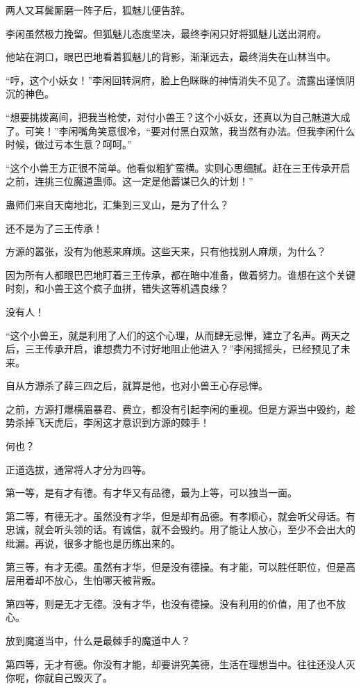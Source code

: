 \begin{this_body}
两人又耳鬓厮磨一阵子后，狐魅儿便告辞。

李闲虽然极力挽留。但狐魅儿态度坚决，最终李闲只好将狐魅儿送出洞府。

他站在洞口，眼巴巴地看着狐魅儿的背影，渐渐远去，最终消失在山林当中。

“哼，这个小妖女！”李闲回转洞府，脸上色眯眯的神情消失不见了。流露出谨慎阴沉的神色。

“想要挑拨离间，把我当枪使，对付小兽王？这个小妖女，还真以为自己魅道大成了。可笑！”李闲嘴角笑意很冷，“要对付黑白双煞，我当然有办法。但我李闲什么时候，做过亏本生意？呵呵。”

“这个小兽王方正很不简单。他看似粗犷蛮横。实则心思细腻。赶在三王传承开启之前，连挑三位魔道蛊师。这一定是他蓄谋已久的计划！”

蛊师们来自天南地北，汇集到三叉山，是为了什么？

还不是为了三王传承！

方源的嚣张，没有为他惹来麻烦。这些天来，只有他找别人麻烦，为什么？

因为所有人都眼巴巴地盯着三王传承，都在暗中准备，做着努力。谁想在这个关键时刻，和小兽王这个疯子血拼，错失这等机遇良缘？

没有人！

“这个小兽王，就是利用了人们的这个心理，从而肆无忌惮，建立了名声。两天之后，三王传承开启，谁想费力不讨好地阻止他进入？”李闲摇摇头，已经预见了未来。

自从方源杀了薛三四之后，就算是他，也对小兽王心存忌惮。

之前，方源打爆横眉暴君、费立，都没有引起李闲的重视。但是方源当中毁约，趁势杀掉飞天虎后，李闲这才意识到方源的棘手！

何也？

正道选拔，通常将人才分为四等。

第一等，是有才有德。有才华又有品德，最为上等，可以独当一面。

第二等，有德无才。虽然没有才华，但是却有品德。有孝顺心，就会听父母话。有忠诚，就会听头领的话。有诚信，就不会毁约。用了能让人放心，至少不会出大的纰漏。再说，很多才能也是历练出来的。

第三等，有才无德。虽然有才华，但是没有德操。有才能，可以胜任职位，但是高层用着却不放心，生怕哪天被背叛。

第四等，则是无才无德。没有才华，也没有德操。没有利用的价值，用了也不放心。

放到魔道当中，什么是最棘手的魔道中人？

第四等，无才有德。你没有才能，却要讲究美德，生活在理想当中。往往还没人灭你呢，你就自己毁灭了。


\end{this_body}
